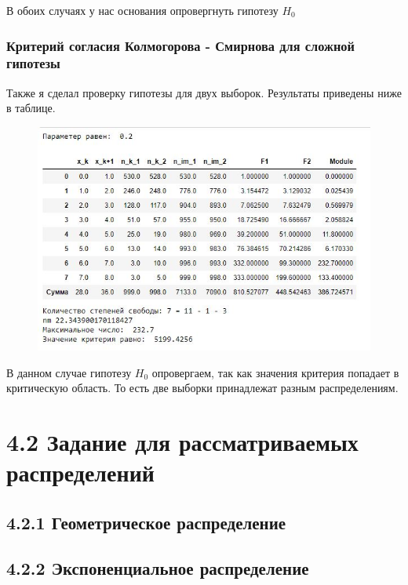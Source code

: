 \documentclass[a4paper,12pt, oneside]{book}
\begin{document}
В обоих случаях у нас основания опровергнуть гипотезу $ H_0 $


\subsection{Критерий согласия Колмогорова - Смирнова для сложной гипотезы}

Также я сделал проверку гипотезы для двух выборок. Результаты приведены ниже в таблице. 
\begin{figure}[h!]
	\begin{center}
		\begin{minipage}[h]{0.47\linewidth}
			{\includegraphics[width=1.5\linewidth]{fotos/kolmogor/tr}}\\
		\end{minipage}
	\end{center}
\end{figure}

В данном случае гипотезу $ H_0 $ опровергаем, так как значения критерия попадает в критическую область. То есть две выборки принадлежат разным распределениям.

\chapter{4.2 Задание для рассматриваемых распределений}

\section{4.2.1 Геометрическое распределение}

\section{4.2.2 Экспоненциальное распределение}
\end{document}
